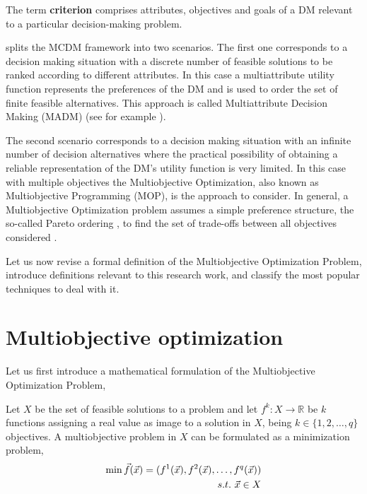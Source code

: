 \begin{defi}\label{defi:criterion}
The term \textbf{criterion} comprises attributes, objectives and goals of a DM relevant to a particular decision-making problem.
\end{defi}

\citet{Romero1993} splits the MCDM framework into two scenarios. The first one corresponds to a decision making situation with a discrete number of feasible solutions to be ranked according to different attributes. In this case a multiattribute utility function represents the preferences of the DM and is used to order the set of finite feasible alternatives. This approach is called Multiattribute Decision Making (MADM) (see for example \citep{tzeng2011}).

The second scenario corresponds to a decision making situation with an infinite number of decision alternatives where the practical possibility of obtaining a reliable representation of the DM's utility function is very limited. In this case with multiple objectives the Multiobjective Optimization, also known as  Multiobjective Programming (MOP), is the approach to consider. In general, a Multiobjective Optimization problem assumes a simple preference structure, the so-called Pareto ordering \citep{Pareto1897}, to find the set of trade-offs between all objectives considered \citep{ChankongHaimes1983}.

Let us now revise a formal definition of the Multiobjective Optimization Problem, introduce definitions relevant to this research work, and classify the most popular techniques to deal with it.

\section{Multiobjective optimization}
\label{chapMultiObjAlg:sec:MOP}

Let us first introduce a mathematical formulation of the Multiobjective Optimization Problem, 

\begin{defi}\label{chapMultiObjAlg:def:multiObjProb}
Let $X$ be the set of feasible solutions to a problem and let $f^k:X \rightarrow \mathbb{R}$ be $k$ functions assigning a real value as image to a solution in $X$, being $k \in \{1,2,\ldots ,q \}$ objectives. A multiobjective problem in $X$ can be formulated as a minimization problem,
\begin{eqnarray}\label{chapMultiObjAlg:eq:probMultiObj}
     \min \vec f(\vec x)=(f^1(\vec x),f^2(\vec x),\ldots ,f^q(\vec x)) \\
\nonumber \raggedleft	  s.t. \ \vec x \in X
\label{chapMultiObjAlg:eq:probMultiObj2}
\end{eqnarray}
\end{defi}

